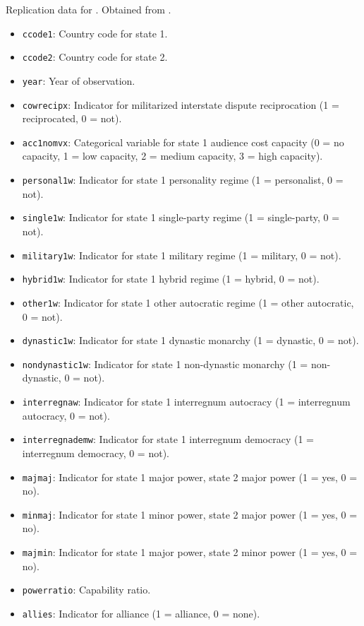 \documentclass[12pt]{article}
\begin{document}
Replication data for \citet{Uzonyi:2012im}.
Obtained from \citet{uzonyi2012data}.

\begin{itemize}
  \item \texttt{ccode1}: Country code for state 1.
  \item \texttt{ccode2}: Country code for state 2.
  \item \texttt{year}: Year of observation.
  \item \texttt{cowrecipx}: Indicator for militarized interstate dispute reciprocation (1 = reciprocated, 0 = not).
  \item \texttt{acc1nomvx}: Categorical variable for state 1 audience cost capacity (0 = no capacity, 1 = low capacity, 2 = medium capacity, 3 = high capacity).
  \item \texttt{personal1w}: Indicator for state 1 personality regime (1 = personalist, 0 = not).
  \item \texttt{single1w}: Indicator for state 1 single-party regime (1 = single-party, 0 = not).
  \item \texttt{military1w}: Indicator for state 1 military regime (1 = military, 0 = not).
  \item \texttt{hybrid1w}: Indicator for state 1 hybrid regime (1 = hybrid, 0 = not).
  \item \texttt{other1w}: Indicator for state 1 other autocratic regime (1 = other autocratic, 0 = not).
  \item \texttt{dynastic1w}: Indicator for state 1 dynastic monarchy (1 = dynastic, 0 = not).
  \item \texttt{nondynastic1w}: Indicator for state 1 non-dynastic monarchy (1 = non-dynastic, 0 = not).
  \item \texttt{interregnaw}: Indicator for state 1 interregnum autocracy (1 = interregnum autocracy, 0 = not).
  \item \texttt{interregnademw}: Indicator for state 1 interregnum democracy (1 = interregnum democracy, 0 = not).
  \item \texttt{majmaj}: Indicator for state 1 major power, state 2 major power (1 = yes, 0 = no).
  \item \texttt{minmaj}: Indicator for state 1 minor power, state 2 major power (1 = yes, 0 = no).
  \item \texttt{majmin}: Indicator for state 1 major power, state 2 minor power (1 = yes, 0 = no).
  \item \texttt{powerratio}: Capability ratio.
  \item \texttt{allies}: Indicator for alliance (1 = alliance, 0 = none).

\end{itemize}
\end{document}

